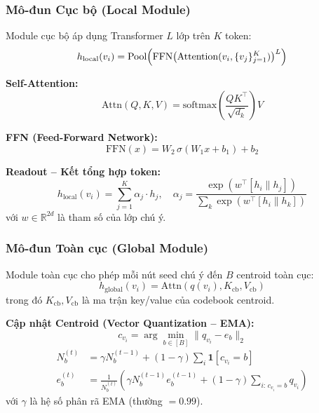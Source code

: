 \documentclass[12pt,a4paper]{article}
\begin{document}
\subsubsection{Mô-đun Cục bộ (Local Module)}

Module cục bộ áp dụng Transformer $L$ lớp trên $K$ token:
\begin{equation}
  h_\text{local}(v_i) = \text{Pool}\Bigl(\text{FFN}\bigl(\text{Attention}(v_i, \{v_j\}_{j=1}^K)\bigr)^L\Bigr)
  \label{eq:local}
\end{equation}

\textbf{Self-Attention:}
\begin{equation}
  \text{Attn}(Q,K,V) = \text{softmax}\!\left(\frac{QK^\top}{\sqrt{d_k}}\right)V
\end{equation}

\textbf{FFN (Feed-Forward Network):}
\begin{equation}
  \text{FFN}(x) = W_2\,\sigma(W_1 x + b_1) + b_2
\end{equation}

\textbf{Readout -- Kết tổng hợp token:}
\begin{equation}
  h_\text{local}(v_i) = \sum_{j=1}^{K} \alpha_j \cdot h_j,
  \quad \alpha_j = \frac{\exp(w^\top [h_i \| h_j])}{\sum_k \exp(w^\top [h_i \| h_k])}
  \label{eq:readout}
\end{equation}
với $w \in \mathbb{R}^{2d}$ là tham số của lớp chú ý.

\subsubsection{Mô-đun Toàn cục (Global Module)}

Module toàn cục cho phép mỗi nút seed chú ý đến $B$ centroid toàn cục:
\begin{equation}
  h_\text{global}(v_i) = \text{Attn}(q(v_i), K_\text{cb}, V_\text{cb})
  \label{eq:global}
\end{equation}
trong đó $K_\text{cb}, V_\text{cb}$ là ma trận key/value của codebook centroid.

\textbf{Cập nhật Centroid (Vector Quantization -- EMA):}
\begin{equation}
  c_{v_i} = \arg\min_{b \in [B]} \| q_{v_i} - e_b \|_2
  \label{eq:vq}
\end{equation}
\begin{align}
  N_b^{(t)} &= \gamma N_b^{(t-1)} + (1-\gamma)\sum_{i} \mathbf{1}[c_{v_i}=b]
  \label{eq:ema1}\\
  e_b^{(t)} &= \frac{1}{N_b^{(t)}} \left(\gamma N_b^{(t-1)} e_b^{(t-1)} + (1-\gamma)\sum_{i:\,c_{v_i}=b} q_{v_i}\right)
  \label{eq:ema2}
\end{align}
với $\gamma$ là hệ số phân rã EMA (thường $= 0.99$).
\end{document}
